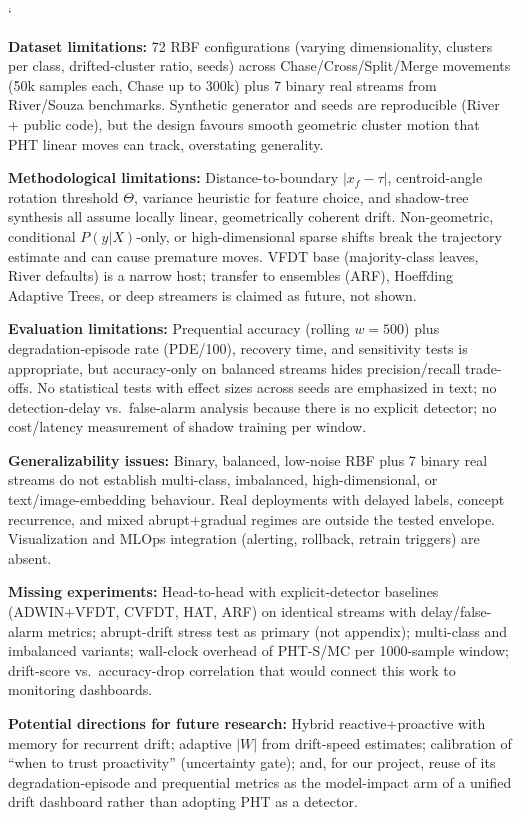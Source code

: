 `\documentclass[10pt]{article}
\newcommand{\sumitem}[2]{\noindent\textbf{#1:} #2\par}
\begin{document}
\sumitem{Dataset limitations}{72 RBF configurations (varying dimensionality, clusters per class, drifted-cluster ratio, seeds) across Chase/Cross/Split/Merge movements (50k samples each, Chase up to 300k) plus 7 binary real streams from River/Souza benchmarks. Synthetic generator and seeds are reproducible (River + public code), but the design favours smooth geometric cluster motion that PHT linear moves can track, overstating generality.}

\sumitem{Methodological limitations}{Distance-to-boundary $|x_f - \tau|$, centroid-angle rotation threshold $\Theta$, variance heuristic for feature choice, and shadow-tree synthesis all assume locally linear, geometrically coherent drift. Non-geometric, conditional $P(y|X)$-only, or high-dimensional sparse shifts break the trajectory estimate and can cause premature moves. VFDT base (majority-class leaves, River defaults) is a narrow host; transfer to ensembles (ARF), Hoeffding Adaptive Trees, or deep streamers is claimed as future, not shown.}

\sumitem{Evaluation limitations}{Prequential accuracy (rolling $w=500$) plus degradation-episode rate (PDE/100), recovery time, and sensitivity tests is appropriate, but accuracy-only on balanced streams hides precision/recall trade-offs. No statistical tests with effect sizes across seeds are emphasized in text; no detection-delay vs.\ false-alarm analysis because there is no explicit detector; no cost/latency measurement of shadow training per window.}

\sumitem{Generalizability issues}{Binary, balanced, low-noise RBF plus 7 binary real streams do not establish multi-class, imbalanced, high-dimensional, or text/image-embedding behaviour. Real deployments with delayed labels, concept recurrence, and mixed abrupt+gradual regimes are outside the tested envelope. Visualization and MLOps integration (alerting, rollback, retrain triggers) are absent.}

\sumitem{Missing experiments}{Head-to-head with explicit-detector baselines (ADWIN+VFDT, CVFDT, HAT, ARF) on identical streams with delay/false-alarm metrics; abrupt-drift stress test as primary (not appendix); multi-class and imbalanced variants; wall-clock overhead of PHT-S/MC per 1000-sample window; drift-score vs.\ accuracy-drop correlation that would connect this work to monitoring dashboards.}

\sumitem{Potential directions for future research}{Hybrid reactive+proactive with memory for recurrent drift; adaptive $|W|$ from drift-speed estimates; calibration of ``when to trust proactivity'' (uncertainty gate); and, for our project, reuse of its degradation-episode and prequential metrics as the model-impact arm of a unified drift dashboard rather than adopting PHT as a detector.}
\end{document}
